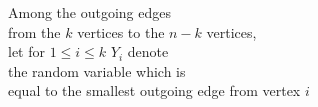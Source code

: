 \documentclass[preview]{standalone}
\begin{document}
\begin{center}
Among the outgoing edges \\from the $k$ vertices to the $n - k$ vertices,\\ let for $1 \leq i \leq k$ $Y_i$ denote \\the random variable which is \\equal to the smallest outgoing edge from vertex $i$
\end{center}
\end{document}

